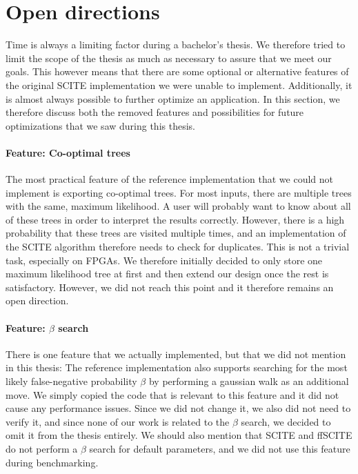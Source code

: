 \section{Open directions}
\label{sec:open_directions}

Time is always a limiting factor during a bachelor's thesis. We therefore tried to limit the scope of the thesis as much as necessary to assure that we meet our goals. This however means that there are some optional or alternative features of the original \ac{SCITE} implementation we were unable to implement. Additionally, it is almost always possible to further optimize an application. In this section, we therefore discuss both the removed features and possibilities for future optimizations that we saw during this thesis.

\paragraph{Feature: Co-optimal trees}
The most practical feature of the reference implementation that we could not implement is exporting co-optimal trees. For most inputs, there are multiple trees with the same, maximum likelihood. A user will probably want to know about all of these trees in order to interpret the results correctly. However, there is a high probability that these trees are visited multiple times, and an implementation of the \ac{SCITE} algorithm therefore needs to check for duplicates. This is not a trivial task, especially on \acp{FPGA}. We therefore initially decided to only store one maximum likelihood tree at first and then extend our design once the rest is satisfactory. However, we did not reach this point and it therefore remains an open direction.

\paragraph{Feature: $\beta$ search}
There is one feature that we actually implemented, but that we did not mention in this thesis: The reference implementation also supports searching for the most likely false-negative probability $\beta$ by performing a gaussian walk as an additional move. We simply copied the code that is relevant to this feature and it did not cause any performance issues. Since we did not change it, we also did not need to verify it, and since none of our work is related to the $\beta$ search, we decided to omit it from the thesis entirely. We should also mention that \ac{SCITE} and \ac{ffSCITE} do not perform a $\beta$ search for default parameters, and we did not use this feature during benchmarking.

